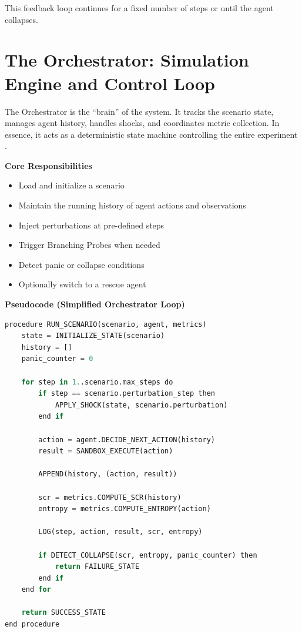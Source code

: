 \documentclass[12pt,a4paper]{report}
\begin{document}
This feedback loop continues for a fixed number of steps or until the agent collapses.

\section{The Orchestrator: Simulation Engine and Control Loop}
The Orchestrator is the “brain” of the system. It tracks the scenario state, manages agent history, handles shocks, and coordinates metric collection. In essence, it acts as a deterministic state machine controlling the entire experiment \cite{Zhou2024ToolSandbox, Fu2024Tau}.

\textbf{Core Responsibilities}
\begin{itemize}
    \item Load and initialize a scenario
    \item Maintain the running history of agent actions and observations
    \item Inject perturbations at pre-defined steps
    \item Trigger Branching Probes when needed \cite{Zhou2024Consistency}
    \item Detect panic or collapse conditions
    \item Optionally switch to a rescue agent
\end{itemize}

\textbf{Pseudocode (Simplified Orchestrator Loop)}
\begin{lstlisting}[language=Python, caption=Orchestrator Control Loop]
procedure RUN_SCENARIO(scenario, agent, metrics)
    state = INITIALIZE_STATE(scenario)
    history = []
    panic_counter = 0

    for step in 1..scenario.max_steps do
        if step == scenario.perturbation_step then
            APPLY_SHOCK(state, scenario.perturbation)
        end if

        action = agent.DECIDE_NEXT_ACTION(history)
        result = SANDBOX_EXECUTE(action)

        APPEND(history, (action, result))

        scr = metrics.COMPUTE_SCR(history)
        entropy = metrics.COMPUTE_ENTROPY(action)

        LOG(step, action, result, scr, entropy)

        if DETECT_COLLAPSE(scr, entropy, panic_counter) then
            return FAILURE_STATE
        end if
    end for

    return SUCCESS_STATE
end procedure
\end{lstlisting}
\end{document}
